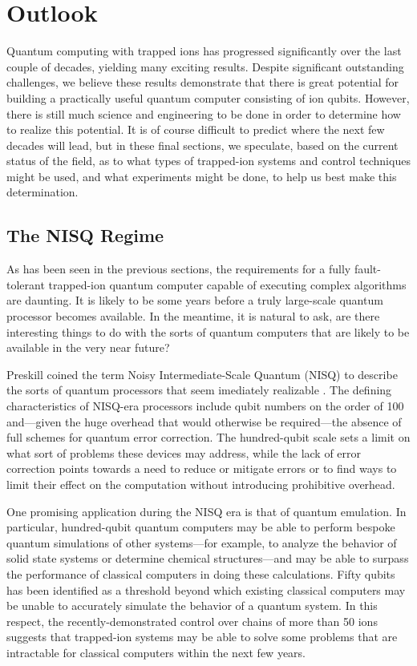 \documentclass[%
reprint,
 amsmath,amssymb,
]{revtex4-1}
\begin{document}
\section{Outlook}
\label{Outlook}
Quantum computing with trapped ions has progressed significantly over the last couple of decades, yielding many exciting results.  Despite significant outstanding challenges, we believe these results demonstrate that there is great potential for building a practically useful quantum computer consisting of ion qubits.  However, there is still much science and engineering to be done in order to determine how to realize this potential.  It is of course difficult to predict where the next few decades will lead, but in these final sections, we speculate, based on the current status of the field, as to what types of trapped-ion systems and control techniques might be used, and what experiments might be done, to help us best make this determination.

\subsection{The NISQ Regime}

As has been seen in the previous sections, the requirements for a fully fault-tolerant trapped-ion quantum computer capable of executing complex algorithms are daunting. It is likely to be some years before a truly large-scale quantum processor becomes available. In the meantime, it is natural to ask, are there interesting things to do with the sorts of quantum computers that are likely to be available in the very near future?

Preskill coined the term Noisy Intermediate-Scale Quantum (NISQ) to describe the sorts of quantum processors that seem imediately realizable \cite{PreskillNISQ2018}. The defining characteristics of NISQ-era processors include qubit numbers on the order of 100 and---given the huge overhead that would otherwise be required---the absence of full schemes for quantum error correction. The hundred-qubit scale sets a limit on what sort of problems these devices may address, while the lack of error correction points towards a need to reduce or mitigate errors or to find ways to limit their effect on the computation without introducing prohibitive overhead.

One promising application during the NISQ era is that of quantum emulation. In particular, hundred-qubit quantum computers may be able to perform bespoke quantum simulations of other systems---for example, to analyze the behavior of solid state systems or determine chemical structures---and may be able to surpass the performance of classical computers in doing these calculations. Fifty qubits has been identified as a threshold \cite{LundBosonSampling2017} beyond which existing classical computers may be unable to accurately simulate the behavior of a quantum system. In this respect, the recently-demonstrated control over chains of more than 50 ions \cite{Zhang53IonSim2017} suggests that trapped-ion systems may be able to solve some problems that are intractable for classical computers within the next few years.
\end{document}
